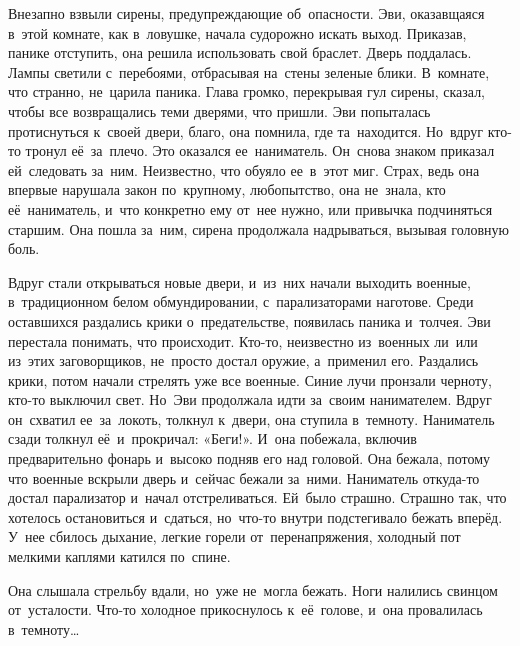 Внезапно взвыли сирены, предупреждающие об~опасности.
Эви, оказавщаяся в~этой комнате, как в~ловушке, начала судорожно искать выход.
Приказав, панике отступить, она решила использовать свой браслет.
Дверь поддалась.
Лампы светили с~перебоями, отбрасывая на~стены зеленые блики.
В~комнате, что странно, не~царила паника.
Глава громко, перекрывая гул сирены, сказал, чтобы все возвращались теми дверями, что пришли.
Эви попыталась протиснуться к~своей двери, благо, она помнила, где та~находится.
Но~вдруг кто-то тронул её~за~плечо.
Это оказался ее~наниматель.
Он~снова знаком приказал ей~следовать за~ним.
Неизвестно, что обуяло ее~в~этот миг.
Страх, ведь она впервые нарушала закон по~крупному, любопытство, она не~знала, кто её~наниматель, и~что конкретно ему от~нее нужно, или привычка подчиняться старшим.
Она пошла за~ним, сирена продолжала надрываться, вызывая головную боль.

Вдруг стали открываться новые двери, и~из~них начали выходить военные, в~традиционном белом обмундировании, с~парализаторами наготове.
Среди оставшихся раздались крики о~предательстве, появилась паника и~толчея.
Эви перестала понимать, что происходит.
Кто-то, неизвестно из~военных ли~или из~этих заговорщиков, не~просто достал оружие, а~применил его.
Раздались крики, потом начали стрелять уже все военные.
Синие лучи пронзали черноту, кто-то выключил свет.
Но~Эви продолжала идти за~своим нанимателем.
Вдруг он~схватил ее~за~локоть, толкнул к~двери, она ступила в~темноту.
Наниматель сзади толкнул её~и~прокричал: «Беги!».
И~она побежала, включив предварительно фонарь и~высоко подняв его над головой.
Она бежала, потому что военные вскрыли дверь и~сейчас бежали за~ними.
Наниматель откуда-то достал парализатор и~начал отстреливаться.
Ей~было страшно.
Страшно так, что хотелось остановиться и~сдаться, но~что-то внутри подстегивало бежать вперёд.
У~нее сбилось дыхание, легкие горели от~перенапряжения, холодный пот мелкими каплями катился по~спине.

Она слышала стрельбу вдали, но~уже не~могла бежать.
Ноги налились свинцом от~усталости.
Что-то холодное прикоснулось к~её~голове, и~она провалилась в~темноту…

\vspace{5mm}


